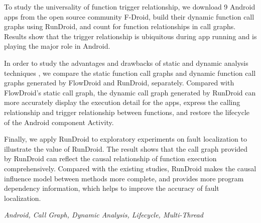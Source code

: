 To study the universality of function trigger relationship, we download 9 Android apps from the open source community F-Droid, build their dynamic function call graphs using RunDroid, and count for function relationships in call graphs.
Results show that the trigger relationship is ubiquitous during app running and is playing the major role in Android.







In order to study the advantages and drawbacks of static and dynamic analysis techniques , 
%
we compare the static function call graphs and dynamic function call graphs generated by FlowDroid and RunDroid, separately.
%
Compared with FlowDroid's static call graph, the dynamic call graph generated by RunDroid can more accurately display the execution detail for the apps, express the calling relationship and trigger relationship between functions, and restore the lifecycle of the Android component Activity.


Finally, we apply RunDroid to exploratory experiments on fault localization to illustrate the value of RunDroid.
The result shows that the call graph provided by RunDroid can  reflect the causal relationship of function execution comprehensively.
Compared with the existing studies, RunDroid makes the causal influence model between methods more complete, and provides more program dependency information, which helps to improve the accuracy of fault localization.






{} \textit{Android, Call Graph, Dynamic Analysis, Lifecycle, Multi-Thread}


































